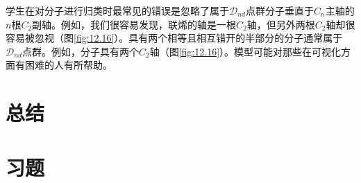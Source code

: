     学生在对分子进行归类时最常见的错误是忽略了属于$\mathscr{D}_{nd}$点群分子垂直于$C_n$主轴的$n$根$C_2$副轴。例如，我们很容易发现，联烯的轴是一根$C_2$轴，但另外两根$C_2$轴却很容易被忽视（图\ref{fig:12.16}）。具有两个相等且相互错开的半部分的分子通常属于$\mathscr{D}_{nd}$点群。例如，分子具有两个$C_2$轴（图\ref{fig:12.16}）。模型可能对那些在可视化方面有困难的人有所帮助。

\section*{总结}

\section*{习题}